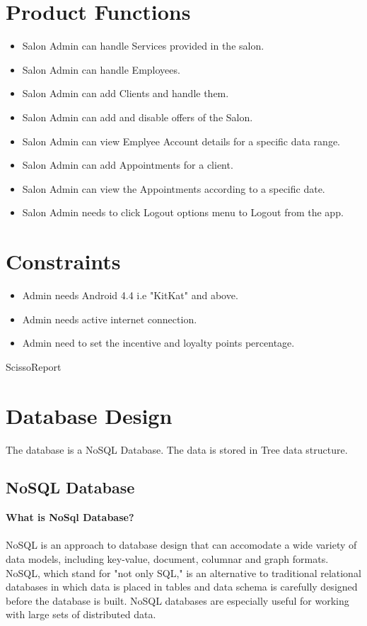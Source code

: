\section{Product Functions}
\begin{itemize}
	\item Salon Admin can handle Services provided in the salon.
	\item Salon Admin can handle Employees.
	\item Salon Admin can add Clients and handle them.
	\item Salon Admin can add and disable offers of the Salon.
	\item Salon Admin can view Emplyee Account details for a specific data range.
	\item Salon Admin can add Appointments for a client.
	\item Salon Admin can view the Appointments according to a specific date.
	\item Salon Admin needs to click Logout options menu to Logout from the app.
\end{itemize}

\section{Constraints} 
\begin{itemize}
	\item Admin needs Android 4.4 i.e "KitKat" and above.
	\item Admin needs active internet connection.
	\item Admin need to set the incentive and loyalty points percentage.
\end{itemize}

ScissoReport
\section{Database Design}
The database is a NoSQL Database. The data is stored in Tree data structure.\\
\subsection{NoSQL Database}
\textbf{What is NoSql Database?}\\
\\
NoSQL is an approach to database design that can accomodate a wide variety of data models, including key-value, document, columnar and graph formats. NoSQL, which stand for "not only SQL," is an alternative to traditional relational databases in which data is placed in tables and data schema is carefully designed before the database is built. NoSQL databases are especially useful for working with large sets of distributed data.\\


